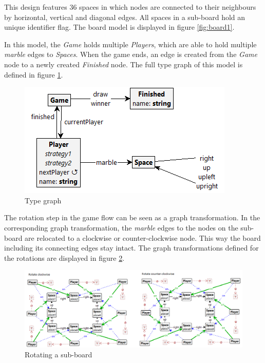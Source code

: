 This design features 36 spaces in which nodes are connected to their neighbours by horizontal, vertical and diagonal edges.
All spaces in a sub-board hold an unique identifier flag.
The board model is displayed in figure \ref{fig:board1}.

\vspace{6pt}

In this model, the \textit{Game} holds multiple \textit{Players}, which are able to hold multiple \textit{marble} edges to \textit{Spaces}. When the game ends, an edge is created from the \textit{Game} node to a newly created \textit{Finished} node. The full type graph of this model is defined in figure \ref{fig:type_graph_pure_graph}.

\begin{figure}[!h]
    \centering
    \includegraphics[scale=0.5,clip]{Images/typegraph_puregraphmodel.png}
    \caption{Type graph}
    \label{fig:type_graph_pure_graph}
\end{figure}

\vspace{6pt}

The rotation step in the game flow can be seen as a graph transformation.
In the corresponding graph transformation, the \textit{marble} edges to the nodes on the sub-board are relocated to a clockwise or counter-clockwise node.
This way the board including its connecting edges stay intact.
The graph transformations defined for the rotations are displayed in figure \ref{fig:rotate1}.

\begin{figure}[!h]
    \centering
    \includegraphics[scale=0.5,clip]{Images/rotate1.png}
    \caption{Rotating a sub-board}
    \label{fig:rotate1}
\end{figure}

